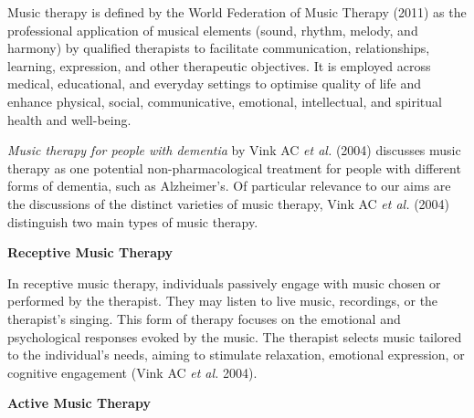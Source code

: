 \documentclass{l4proj}
\begin{document}

Music therapy is defined by the World Federation of Music Therapy (2011) as the professional application of musical elements (sound, rhythm, melody, and harmony) by qualified therapists to facilitate communication, relationships, learning, expression, and other therapeutic objectives. It is employed across medical, educational, and everyday settings to optimise quality of life and enhance physical, social, communicative, emotional, intellectual, and spiritual health and well-being.

\emph{Music therapy for people with dementia} by Vink AC \emph{et al.} (2004) discusses music therapy as one potential non-pharmacological treatment for people with different forms of dementia, such as Alzheimer's. Of particular relevance to our aims are the discussions of the distinct varieties of music therapy, Vink AC \emph{et al.} (2004) distinguish two main types of music therapy.
\newline

\textbf{Receptive Music Therapy}
\newline

In receptive music therapy, individuals passively engage with music chosen or performed by the therapist. They may listen to live music, recordings, or the therapist's singing. This form of therapy focuses on the emotional and psychological responses evoked by the music. The therapist selects music tailored to the individual's needs, aiming to stimulate relaxation, emotional expression, or cognitive engagement (Vink AC \emph{et al.} 2004).
\newline

\textbf{Active Music Therapy}
\newline
\end{document}
